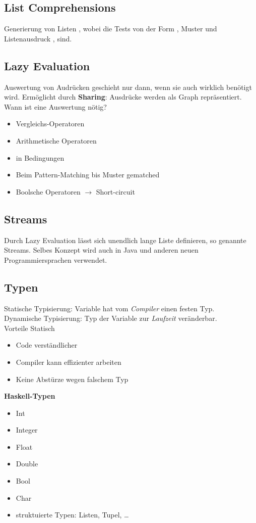 \subsection{List Comprehensions}%
\label{hsk:sub:list-comprehensions}
Generierung von Listen \code{\([e | q_1, ..., q_m]\)}, wobei die  Tests von der Form
, Muster  und Listenausdruck , sind.

\subsection{Lazy Evaluation}%
\label{hsk:sub:lazy-evaluation}
Auswertung von Audrücken geschieht nur dann, wenn sie auch wirklich benötigt wird. Ermöglicht durch \textbf{Sharing}:
Ausdrücke werden als Graph repräsentiert.\\
Wann ist eine Auswertung nötig?
\begin{itemize}
  \item Vergleichs-Operatoren
  \item Arithmetische Operatoren
  \item in Bedingungen
  \item Beim Pattern-Matching bis Muster gematched
  \item Boolsche Operatoren \(\rightarrow\) Short-circuit
\end{itemize}

\subsection{Streams}%
\label{hsk:sub:streams}
Durch Lazy Evaluation lässt sich unendlich lange Liste definieren, so genannte Streams.
Selbes Konzept wird auch in Java und anderen neuen Programmiersprachen verwendet.

\subsection{Typen}%
\label{hsk:sub:typen}
Statische Typisierung: Variable hat vom \textit{Compiler} einen festen Typ.\\
Dynamische Typisierung: Typ der Variable zur \textit{Laufzeit} veränderbar.\\
Vorteile Statisch
\begin{itemize}
  \item Code verständlicher
  \item Compiler kann effizienter arbeiten
  \item Keine Abstürze wegen falschem Typ
\end{itemize}
\textbf{Haskell-Typen}
\begin{itemize}
  \item Int
  \item Integer
  \item Float
  \item Double
  \item Bool
  \item Char
  \item struktuierte Typen: Listen, Tupel, \ldots 
\end{itemize}

